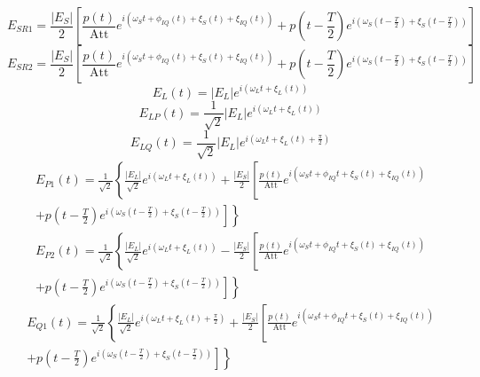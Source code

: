 \begin{equation}\label{eq:10}
E_{SR1}=\frac{|E_S|}{2}\left[\frac{p(t)}{\text{Att}}e^{i\left(\omega_St+\phi_{IQ}(t)+\xi_S(t)+\xi_{IQ}(t)\right)}+p\left(t-\frac{T}{2}\right)e^{i\left(\omega_S\left(t-\frac{T}{2}\right)+\xi_S\left(t-\frac{T}{2}\right)\right)}\right]
\end{equation}
\begin{equation}\label{eq:11}
E_{SR2}=\frac{|E_S|}{2}\left[\frac{p(t)}{\text{Att}}e^{i\left(\omega_St+\phi_{IQ}(t)+\xi_S(t)+\xi_{IQ}(t)\right)}+p\left(t-\frac{T}{2}\right)e^{i\left(\omega_S\left(t-\frac{T}{2}\right)+\xi_S\left(t-\frac{T}{2}\right)\right)}\right]
\end{equation}
\begin{equation}\label{eq:12}
E_L(t)=|E_L|e^{i\left(\omega_Lt+\xi_L(t)\right)}
\end{equation}
\begin{equation}\label{eq:13}
E_{LP}(t)=\frac{1}{\sqrt{2}}|E_L|e^{i\left(\omega_Lt+\xi_L(t)\right)}
\end{equation}
\begin{equation}\label{eq:14}
E_{LQ}(t)=\frac{1}{\sqrt{2}}|E_L|e^{i\left(\omega_Lt+\xi_L(t)+\frac{\pi}{2}\right)}
\end{equation}
\begin{multline}\label{eq:15}
E_{P1}(t)=\frac{1}{\sqrt{2}}\left\lbrace\frac{|E_L|}{\sqrt{2}}e^{i\left(\omega_Lt+\xi_L(t)\right)}+\frac{|E_S|}{2}\left[\frac{p(t)}{\text{Att}}e^{i(\omega_St+\phi_{IQ}t+\xi_S(t)+\xi_{IQ}(t))}\right.\right.\\
\left.\left.+p\left(t-\frac{T}{2}\right)e^{i\left(\omega_S\left(t-\frac{T}{2}\right)+\xi_S\left(t-\frac{T}{2}\right)\right)}\right]\right\rbrace
\end{multline}
\begin{multline}\label{eq:16}
E_{P2}(t)=\frac{1}{\sqrt{2}}\left\lbrace\frac{|E_L|}{\sqrt{2}}e^{i\left(\omega_Lt+\xi_L(t)\right)}-\frac{|E_S|}{2}\left[\frac{p(t)}{\text{Att}}e^{i(\omega_St+\phi_{IQ}t+\xi_S(t)+\xi_{IQ}(t))}\right.\right.\\
\left.\left.+p\left(t-\frac{T}{2}\right)e^{i\left(\omega_S\left(t-\frac{T}{2}\right)+\xi_S\left(t-\frac{T}{2}\right)\right)}\right]\right\rbrace
\end{multline}
\begin{multline}\label{eq:17}
E_{Q1}(t)=\frac{1}{\sqrt{2}}\left\lbrace\frac{|E_L|}{\sqrt{2}}e^{i\left(\omega_Lt+\xi_L(t)+\frac{\pi}{2}\right)}+\frac{|E_S|}{2}\left[\frac{p(t)}{\text{Att}}e^{i(\omega_St+\phi_{IQ}t+\xi_S(t)+\xi_{IQ}(t))}\right.\right.\\
\left.\left.+p\left(t-\frac{T}{2}\right)e^{i\left(\omega_S\left(t-\frac{T}{2}\right)+\xi_S\left(t-\frac{T}{2}\right)\right)}\right]\right\rbrace
\end{multline}
